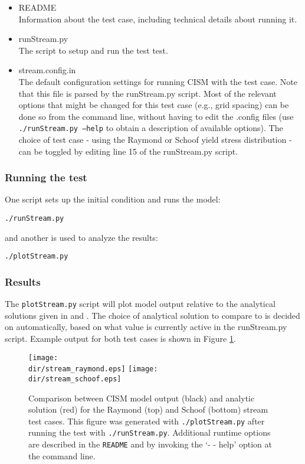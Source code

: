 \begin{itemize}
	\item README \\
		Information about the test case, including technical details about running it.
	\item runStream.py \\
		The script to setup and run the test test.
	\item stream.config.in \\
  The default configuration settings for running CISM with the test case. Note that this
  file is parsed by the runStream.py script. Most of the relevant options that might be changed
  for this test case (e.g., grid spacing) can be done so from the command line, without having to
  edit the .config files (use \texttt{./runStream.py --help} to obtain a description of available options).
  The choice of test case - using the Raymond or Schoof yield stress distribution -  can be toggled 
  by editing line 15 of the runStream.py script.
\end{itemize}

\subsubsection{Running the test}
One script sets up the initial condition and runs the model:

\texttt{./runStream.py}

and another is used to analyze the results:

\texttt{./plotStream.py}

\subsubsection{Results}
The \texttt{plotStream.py} script will plot model output relative to the analytical solutions
given in \citet{Raymond2000} and \citet{Schoof2006}. The choice of analytical solution to compare
to is decided on automatically, based on what value is currently active in the runStream.py script. 
Example output for both test cases is shown in Figure \ref{fig:stream-results}.
	
\begin{figure}[H!]
  \begin{center}
	\texttt{[image: \\dir/stream\_raymond.eps]}
	\texttt{[image: \\dir/stream\_schoof.eps]}
  \end{center}
  \caption{Comparison between CISM model output (black) and analytic solution (red) for the Raymond (top) and Schoof (bottom) stream test cases. This figure was generated with \texttt{./plotStream.py} after running the test with \texttt{./runStream.py}.
Additional runtime options are described in the \texttt{README} and by invoking the `- - help' option at the command line.}
  \label{fig:stream-results}
\end{figure} 


